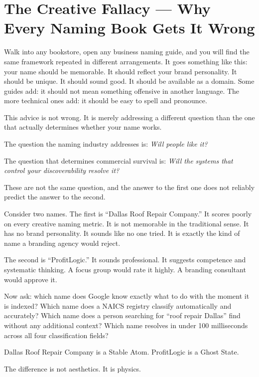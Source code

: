 \documentclass[12pt, openany]{book}
\theoremstyle{thmstyle}
\theoremstyle{defstyle}
\begin{document}
\section{The Creative Fallacy --- Why Every Naming Book Gets It Wrong}

Walk into any bookstore, open any business naming guide, and you will find the same framework repeated in different arrangements. It goes something like this: your name should be memorable. It should reflect your brand personality. It should be unique. It should sound good. It should be available as a domain. Some guides add: it should not mean something offensive in another language. The more technical ones add: it should be easy to spell and pronounce.

This advice is not wrong. It is merely addressing a different question than the one that actually determines whether your name works.

The question the naming industry addresses is: \textit{Will people like it?}

The question that determines commercial survival is: \textit{Will the systems that control your discoverability resolve it?}

These are not the same question, and the answer to the first one does not reliably predict the answer to the second.

\vspace{8pt}

Consider two names. The first is ``Dallas Roof Repair Company.'' It scores poorly on every creative naming metric. It is not memorable in the traditional sense. It has no brand personality. It sounds like no one tried. It is exactly the kind of name a branding agency would reject.

The second is ``ProfitLogic.'' It sounds professional. It suggests competence and systematic thinking. A focus group would rate it highly. A branding consultant would approve it.

Now ask: which name does Google know exactly what to do with the moment it is indexed? Which name does a NAICS registry classify automatically and accurately? Which name does a person searching for ``roof repair Dallas'' find without any additional context? Which name resolves in under 100 milliseconds across all four classification fields?

Dallas Roof Repair Company is a Stable Atom. ProfitLogic is a Ghost State.

The difference is not aesthetics. It is physics.
\end{document}
